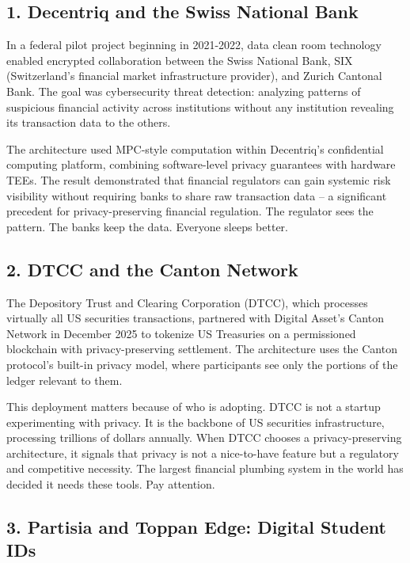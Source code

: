 \documentclass[
  11pt,
  openany]{report}
\begin{document}
\subsection{1. Decentriq and the Swiss National
Bank}\label{decentriq-and-the-swiss-national-bank}

In a federal pilot project beginning in 2021-2022, data clean room technology
enabled encrypted collaboration between the Swiss National Bank, SIX
(Switzerland's financial market infrastructure provider), and Zurich Cantonal
Bank. The goal was cybersecurity threat detection: analyzing patterns of
suspicious financial activity across institutions without any institution
revealing its transaction data to the others.

The architecture used MPC-style computation within Decentriq's confidential
computing platform, combining software-level privacy guarantees with hardware
TEEs. The result demonstrated that financial regulators can gain systemic risk
visibility without requiring banks to share raw transaction data -- a
significant precedent for privacy-preserving financial regulation. The regulator
sees the pattern. The banks keep the data. Everyone sleeps better.

\subsection{2. DTCC and the Canton Network}\label{dtcc-and-the-canton-network}

The Depository Trust and Clearing Corporation (DTCC), which processes virtually
all US securities transactions, partnered with Digital Asset's Canton Network in
December 2025 to tokenize US Treasuries on a permissioned blockchain with
privacy-preserving settlement. The architecture uses the Canton protocol's
built-in privacy model, where participants see only the portions of the ledger
relevant to them.

This deployment matters because of who is adopting. DTCC is not a startup
experimenting with privacy. It is the backbone of US securities infrastructure,
processing trillions of dollars annually. When DTCC chooses a privacy-preserving
architecture, it signals that privacy is not a nice-to-have feature but a
regulatory and competitive necessity. The largest financial plumbing system in
the world has decided it needs these tools. Pay attention.

\subsection{3. Partisia and Toppan Edge: Digital Student
IDs}\label{partisia-and-toppan-edge-digital-student-ids}
\end{document}
